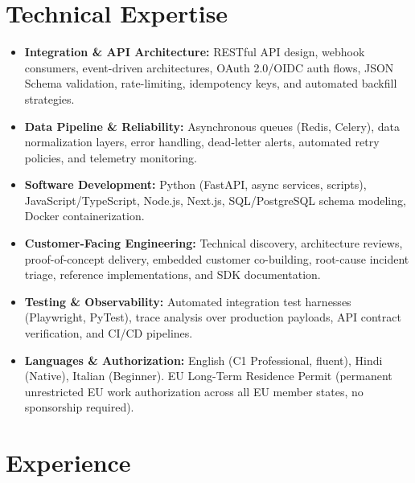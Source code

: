 \documentclass[10pt,a4paper]{article}
\begin{document}
\section{Technical Expertise}
\begin{itemize}
  \item \textbf{Integration \& API Architecture:} RESTful API design, webhook consumers, event-driven architectures, OAuth 2.0/OIDC auth flows, JSON Schema validation, rate-limiting, idempotency keys, and automated backfill strategies.
  \item \textbf{Data Pipeline \& Reliability:} Asynchronous queues (Redis, Celery), data normalization layers, error handling, dead-letter alerts, automated retry policies, and telemetry monitoring.
  \item \textbf{Software Development:} Python (FastAPI, async services, scripts), JavaScript/TypeScript, Node.js, Next.js, SQL/PostgreSQL schema modeling, Docker containerization.
  \item \textbf{Customer-Facing Engineering:} Technical discovery, architecture reviews, proof-of-concept delivery, embedded customer co-building, root-cause incident triage, reference implementations, and SDK documentation.
  \item \textbf{Testing \& Observability:} Automated integration test harnesses (Playwright, PyTest), trace analysis over production payloads, API contract verification, and CI/CD pipelines.
  \item \textbf{Languages \& Authorization:} English (C1 Professional, fluent), Hindi (Native), Italian (Beginner). EU Long-Term Residence Permit (permanent unrestricted EU work authorization across all EU member states, no sponsorship required).
\end{itemize}

\section{Experience}
\end{document}

